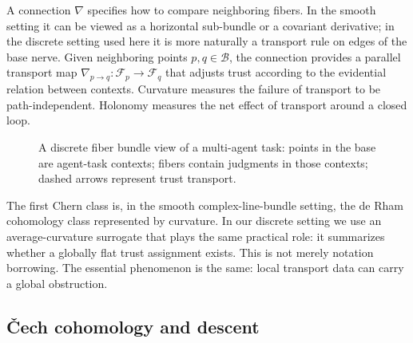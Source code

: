 \documentclass[11pt]{article}
\newcommand{\Bundle}{\mathcal{E}}
\newcommand{\Base}{\mathcal{B}}
\newcommand{\Fiber}{\mathcal{F}}
\newcommand{\Conn}{\nabla}
\begin{document}
A connection $\Conn$ specifies how to compare neighboring fibers.  In the smooth
setting it can be viewed as a horizontal sub-bundle or a covariant derivative;
in the discrete setting used here it is more naturally a transport rule on edges
of the base nerve.  Given neighboring points $p,q \in \Base$, the connection
provides a parallel transport map $\Conn_{p \to q} : \Fiber_p \to \Fiber_q$ that
adjusts trust according to the evidential relation between contexts.  Curvature
measures the failure of transport to be path-independent.  Holonomy measures the
net effect of transport around a closed loop.

\begin{figure}[H]
\centering
{}
\caption{A discrete fiber bundle view of a multi-agent task: points in the base
are agent-task contexts; fibers contain judgments in those contexts; dashed
arrows represent trust transport.}
\label{fig:fiber-schematic}
\end{figure}

The first Chern class is, in the smooth complex-line-bundle setting, the de Rham
cohomology class represented by curvature.  In our discrete setting we use an
average-curvature surrogate that plays the same practical role: it summarizes
whether a globally flat trust assignment exists.  This is not merely notation
borrowing.  The essential phenomenon is the same: local transport data can carry
a global obstruction.

\subsection{\v{C}ech cohomology and descent}
\end{document}
